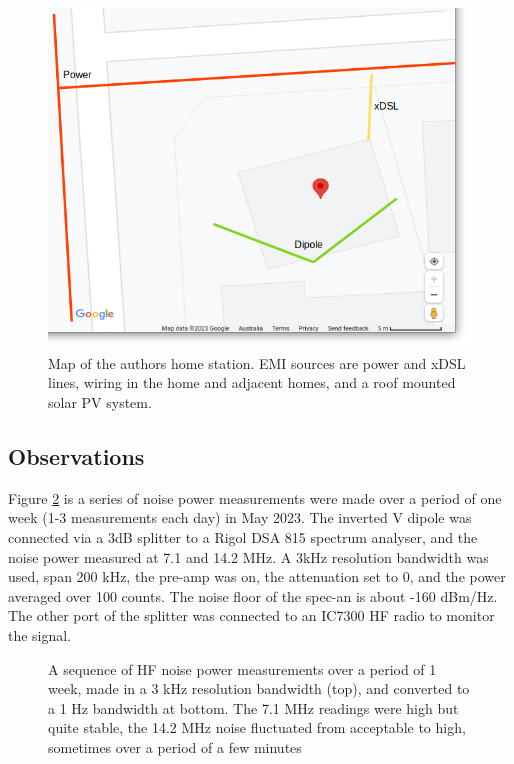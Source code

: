 \documentclass{article}
\begin{document}
\begin{figure}[h]
\caption{Map of the authors home station.  EMI sources are power and xDSL lines, wiring in the home and adjacent homes, and a roof mounted solar PV system.}
\label{fig:home_map}
\begin{center}
\includegraphics[width=12cm]{house_map.png}
\end{center}
\end{figure}

\subsection{Observations}

Figure \ref{fig:noise_measurements} is a series of noise power measurements were made over a period of one week (1-3 measurements each day) in May 2023.  The inverted V dipole was connected via a 3dB splitter to a Rigol DSA 815 spectrum analyser, and the noise power measured at 7.1 and 14.2 MHz.  A 3kHz resolution bandwidth was used, span 200 kHz, the pre-amp was on, the attenuation set to 0, and the power averaged over 100 counts.  The noise floor of the spec-an is about -160 dBm/Hz. The other port of the splitter was connected to an IC7300 HF radio to monitor the signal.

\begin{figure}[h]
\caption{A sequence of HF noise power measurements over a period of 1 week, made in a 3 kHz resolution bandwidth (top), and converted to a 1 Hz bandwidth at bottom. The 7.1 MHz readings were high but quite stable, the 14.2 MHz noise fluctuated from acceptable to high, sometimes over a period of a few minutes}
\label{fig:noise_measurements}
\begin{center}

\end{center}
\end{figure}
\end{document}
